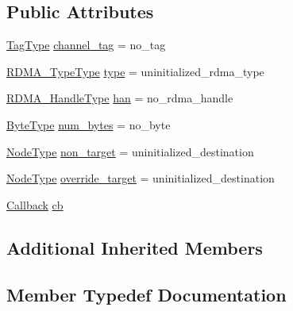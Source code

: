 \subsection*{Public Attributes}
\begin{DoxyCompactItemize}
\item 
\hyperlink{namespacevt_a84ab281dae04a52a4b243d6bf62d0e52}{Tag\+Type} \hyperlink{structvt_1_1rdma_1_1_channel_message_ae9a6b2fc52d68e41c051e760f8ca9fa9}{channel\+\_\+tag} = no\+\_\+tag
\item 
\hyperlink{namespacevt_1_1rdma_ac848e1d9da43db6294bd06f83e5d3946}{R\+D\+M\+A\+\_\+\+Type\+Type} \hyperlink{structvt_1_1rdma_1_1_channel_message_a325d169e844b5de16a885852841ec25a}{type} = uninitialized\+\_\+rdma\+\_\+type
\item 
\hyperlink{namespacevt_a10442579ec4e7ebef223818e64bcf908}{R\+D\+M\+A\+\_\+\+Handle\+Type} \hyperlink{structvt_1_1rdma_1_1_channel_message_a9c91ffd641d8e7b05a4ee6999aad3cc1}{han} = no\+\_\+rdma\+\_\+handle
\item 
\hyperlink{namespacevt_aab8d55968084610ce3b17057981e9300}{Byte\+Type} \hyperlink{structvt_1_1rdma_1_1_channel_message_ae6eacd8bc1177ce518f8cf061163a9e5}{num\+\_\+bytes} = no\+\_\+byte
\item 
\hyperlink{namespacevt_a866da9d0efc19c0a1ce79e9e492f47e2}{Node\+Type} \hyperlink{structvt_1_1rdma_1_1_channel_message_a74a29aa6eedac5f27939642e81d31c59}{non\+\_\+target} = uninitialized\+\_\+destination
\item 
\hyperlink{namespacevt_a866da9d0efc19c0a1ce79e9e492f47e2}{Node\+Type} \hyperlink{structvt_1_1rdma_1_1_channel_message_a6becb5011a81e9e52210f075406f848c}{override\+\_\+target} = uninitialized\+\_\+destination
\item 
\hyperlink{namespacevt_a36db99df4c973d48b1118a293fff533f}{Callback} \hyperlink{structvt_1_1rdma_1_1_channel_message_a70ba36eb1157e5c095c5acc79f9ba4f4}{cb}
\end{DoxyCompactItemize}
\subsection*{Additional Inherited Members}


\subsection{Member Typedef Documentation}
\mbox{\label{structvt_1_1rdma_1_1_channel_message_a8cd82de8b91d466fbae2abf28e668c0c}} 
